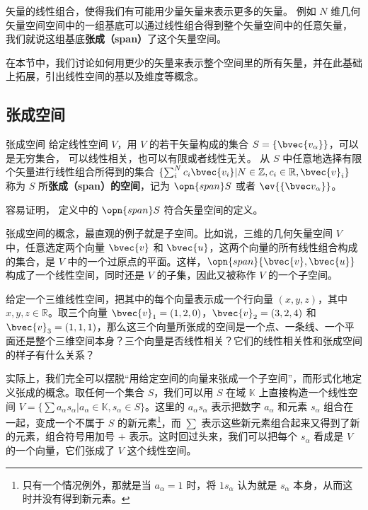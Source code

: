 

矢量的线性组合，使得我们有可能用少量矢量来表示更多的矢量。 例如 $N$ 维几何矢量空间空间中的一组基底可以通过线性组合得到整个矢量空间中的任意矢量， 我们就说这组基底\textbf{张成（span）}了这个矢量空间。 

在本节中，我们讨论如何用更少的矢量来表示整个空间里的所有矢量，并在此基础上拓展，引出线性空间的基以及维度等概念。

\subsection{张成空间}

\begin{definition}{张成空间}\label{def_VecSpn_1}
给定线性空间 $V$，用 $V$ 的若干矢量构成的集合 $S=\{\bvec{v_\alpha}\}$，可以是无穷集合， 可以线性相关，也可以有限或者线性无关。 从 $S$ 中任意地选择有限个矢量进行线性组合所得到的集合 $\{\sum_i^N c_i\bvec{v_i}|N\in\mathbb{Z}, c_i\in\mathbb{R}, \bvec{v}_i\}$ 称为 $S$ 所\textbf{张成（span）的空间}，记为 $\opn{span} S$ 或者 $\ev{\{\bvec v_\alpha\}}$。
\end{definition}
容易证明， 定义中的 $\opn{span} S$ 符合矢量空间的定义。

张成空间的概念，最直观的例子就是子空间。比如说，三维的几何矢量空间 $V$ 中，任意选定两个向量 $\bvec{v}$ 和 $\bvec{u}$，这两个向量的所有线性组合构成的集合，是 $V$ 中的一个过原点的平面。这样，$\opn{span}\{\bvec{v}, \bvec{u}\}$ 构成了一个线性空间，同时还是 $V$ 的子集，因此又被称作 $V$ 的一个子空间。

\begin{exercise}{}\label{exe_VecSpn_1}
给定一个三维线性空间，把其中的每个向量表示成一个行向量 $(x,y,z)$，其中 $x,y,z\in\mathbb{R}$。取三个向量 $\bvec{v}_1=(1,2,0)$，$\bvec{v}_2=(3,2,4)$ 和 $\bvec{v}_3=(1,1,1)$，那么这三个向量所张成的空间是一个点、一条线、一个平面还是整个三维空间本身？三个向量是否线性相关？它们的线性相关性和张成空间的样子有什么关系？
\end{exercise}

实际上，我们完全可以摆脱“用给定空间的向量来张成一个子空间”，而形式化地定义张成的概念。取任何一个集合 $S$，我们可以用 $S$ 在域 $\mathbb{K}$ 上直接构造一个线性空间 $V=\{\sum a_\alpha s_\alpha|a_\alpha\in\mathbb{K}, s_\alpha\in S\}$。这里的 $a_\alpha s_\alpha$ 表示把数字 $a_\alpha$ 和元素 $s_\alpha$ 组合在一起，变成一个不属于 $S$ 的新元素\footnote{只有一个情况例外，那就是当 $a_\alpha=1$ 时，将 $1s_\alpha$ 认为就是 $s_\alpha$ 本身，从而这时并没有得到新元素。}，而 $\sum$ 表示这些新元素组合起来又得到了新的元素，组合符号用加号 $+$ 表示。这时回过头来，我们可以把每个 $s_\alpha$ 看成是 $V$ 的一个向量，它们张成了 $V$ 这个线性空间。


